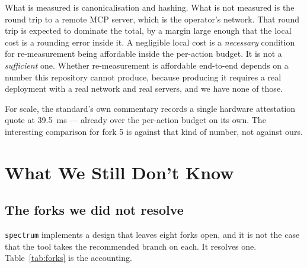 \documentclass[11pt]{article}
\newcommand{\spectrum}{\texttt{spectrum}}
\begin{document}
What is measured is canonicalisation and hashing. What is not measured is the
round trip to a remote MCP server, which is the operator's network. That round
trip is expected to dominate the total, by a margin large enough that the
local cost is a rounding error inside it. A negligible local cost is a
\emph{necessary} condition for re-measurement being affordable inside the
per-action budget. It is not a \emph{sufficient} one. Whether re-measurement
is affordable end-to-end depends on a number this repository cannot produce,
because producing it requires a real deployment with a real network and real
servers, and we have none of those.

For scale, the standard's own commentary records a single hardware attestation
quote at \SI{39.5}{\milli\second} \cite{pocspec} --- already over the
per-action budget on its own. The interesting comparison for fork 5 is against
that kind of number, not against ours.

\section{What We Still Don't Know}
\label{sec:unknown}

\subsection{The forks we did not resolve}

\spectrum{} implements a design that leaves eight forks open, and it is not
the case that the tool takes the recommended branch on each. It resolves one.
Table~\ref{tab:forks} is the accounting.
\end{document}
